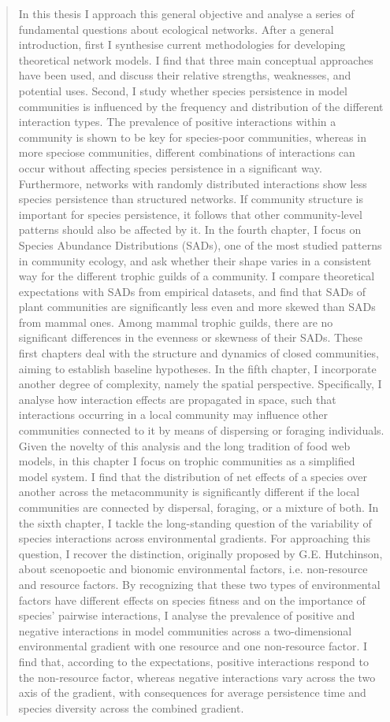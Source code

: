 \documentclass[10pt,a4paper,twoside,fleqn,showtrims]{memoir}
\begin{document}
\begin{abstract}
In this thesis I approach this general objective and analyse a series of fundamental questions about ecological networks. After a general introduction, first I synthesise current methodologies for developing theoretical network models. I find that three main conceptual approaches have been used, and discuss their relative strengths, weaknesses, and potential uses. Second, I study whether species persistence in model communities is influenced by the frequency and distribution of the different interaction types. The prevalence of positive interactions within a community is shown to be key for species-poor communities, whereas in more speciose communities, different combinations of interactions can occur without affecting species persistence in a significant way. Furthermore, networks with randomly distributed interactions show less species persistence than structured networks. If community structure is important for species persistence, it follows that other community-level patterns should also be affected by it. In the fourth chapter, I focus on Species Abundance Distributions (SADs), one of the most studied patterns in community ecology, and ask whether their shape varies in a consistent way for the different trophic guilds of a community. I compare theoretical expectations with SADs from empirical datasets, and find that SADs of plant communities are significantly less even and more skewed than SADs from mammal ones. Among mammal trophic guilds, there are no significant differences in the evenness or skewness of their SADs. These first chapters deal with the structure and dynamics of closed communities, aiming to establish baseline hypotheses. In the fifth chapter, I incorporate another degree of complexity, namely the spatial perspective. Specifically, I analyse how interaction effects are propagated in space, such that interactions occurring in a local community may influence other communities connected to it by means of dispersing or foraging individuals. Given the novelty of this analysis and the long tradition of food web models, in this chapter I focus on trophic communities as a simplified model system. I find that the distribution of net effects of a species over another across the metacommunity is significantly different if the local communities are connected by dispersal, foraging, or a mixture of both. In the sixth chapter, I tackle the long-standing question of the variability of species interactions across environmental gradients. For approaching this question, I recover the distinction, originally proposed by G.E. Hutchinson, about scenopoetic and bionomic environmental factors, i.e. non-resource and resource factors. By recognizing that these two types of environmental factors have different effects on species fitness and on the importance of species’ pairwise interactions, I analyse the prevalence of positive and negative interactions in model communities across a two-dimensional environmental gradient with one resource and one non-resource factor. I find that, according to the expectations, positive interactions respond to the non-resource factor, whereas negative interactions vary across the two axis of the gradient, with consequences for average persistence time and species diversity across the combined gradient.


\end{abstract}
\end{document}
